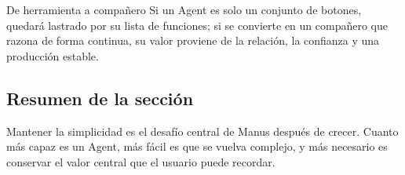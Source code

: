 \begin{importantbox}{De herramienta a compañero}
Si un Agent es solo un conjunto de botones, quedará lastrado por su lista de funciones; si se convierte en un compañero que razona de forma continua, su valor proviene de la relación, la confianza y una producción estable.
\end{importantbox}

\subsection{Resumen de la sección}

Mantener la simplicidad es el desafío central de Manus después de crecer. Cuanto más capaz es un Agent, más fácil es que se vuelva complejo, y más necesario es conservar el valor central que el usuario puede recordar.
